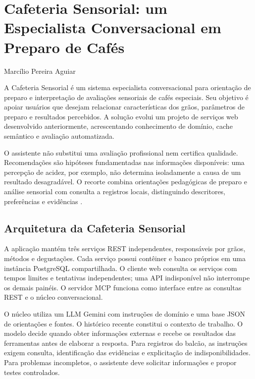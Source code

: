 \chapter{Cafeteria Sensorial: um Especialista Conversacional em Preparo de Cafés}
\begin{flushright}
Marcílio Pereira Aguiar
\end{flushright}

A Cafeteria Sensorial é um sistema especialista conversacional para orientação de preparo e interpretação de avaliações sensoriais de cafés especiais. Seu objetivo é apoiar usuários que desejam relacionar características dos grãos, parâmetros de preparo e resultados percebidos. A solução evolui um projeto de serviços web desenvolvido anteriormente, acrescentando conhecimento de domínio, cache semântico e avaliação automatizada.

O assistente não substitui uma avaliação profissional nem certifica qualidade. Recomendações são hipóteses fundamentadas nas informações disponíveis: uma percepção de acidez, por exemplo, não determina isoladamente a causa de um resultado desagradável. O recorte combina orientações pedagógicas de preparo e análise sensorial com consulta a registros locais, distinguindo descritores, preferências e evidências \cite{cafe_sca_ratio,cafe_compass,cafe_sca_cva}.

\section{Arquitetura da Cafeteria Sensorial}

A aplicação mantém três serviços REST independentes, responsáveis por grãos, métodos e degustações. Cada serviço possui contêiner e banco próprios em uma instância PostgreSQL compartilhada. O cliente web consulta os serviços com tempos limites e tentativas independentes; uma API indisponível não interrompe os demais painéis. O servidor MCP funciona como interface entre as consultas REST e o núcleo conversacional.

O núcleo utiliza um LLM Gemini com instruções de domínio e uma base JSON de orientações e fontes. O histórico recente constitui o contexto de trabalho. O modelo decide quando obter informações externas e recebe os resultados das ferramentas antes de elaborar a resposta. Para registros do balcão, as instruções exigem consulta, identificação das evidências e explicitação de indisponibilidades. Para problemas incompletos, o assistente deve solicitar informações e propor testes controlados.

